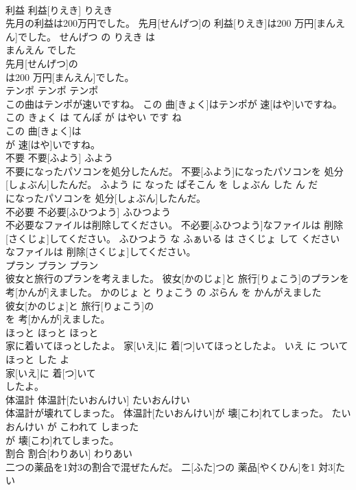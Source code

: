 \documentclass[8pt]{extreport}
\begin{document}
\begin{CJK}{UTF8}{min}
\\	利益	利益[りえき]	りえき	
\\	先月の利益は200万円でした。	先月[せんげつ]の 利益[りえき]は200 万円[まんえん]でした。	せんげつ の りえき は 
\\	まんえん でした	
\\	先月[せんげつ]の
\\	は200 万円[まんえん]でした。			
\\	テンポ	テンポ	テンポ	
\\	この曲はテンポが速いですね。	この 曲[きょく]はテンポが 速[はや]いですね。	この きょく は てんぽ が はやい です ね	
\\	この 曲[きょく]は
\\	が 速[はや]いですね。			
\\	不要	不要[ふよう]	ふよう	
\\	不要になったパソコンを処分したんだ。	不要[ふよう]になったパソコンを 処分[しょぶん]したんだ。	ふよう に なった ぱそこん を しょぶん した ん だ	
\\	になったパソコンを 処分[しょぶん]したんだ。			
\\	不必要	不必要[ふひつよう]	ふひつよう	
\\	不必要なファイルは削除してください。	不必要[ふひつよう]なファイルは 削除[さくじょ]してください。	ふひつよう な ふぁいる は さくじょ して ください	
\\	なファイルは 削除[さくじょ]してください。			
\\	プラン	プラン	プラン	
\\	彼女と旅行のプランを考えました。	彼女[かのじょ]と 旅行[りょこう]のプランを 考[かんが]えました。	かのじょ と りょこう の ぷらん を かんがえました	
\\	彼女[かのじょ]と 旅行[りょこう]の
\\	を 考[かんが]えました。			
\\	ほっと	ほっと	ほっと	
\\	家に着いてほっとしたよ。	家[いえ]に 着[つ]いてほっとしたよ。	いえ に ついて ほっと した よ	
\\	家[いえ]に 着[つ]いて
\\	したよ。			
\\	体温計	体温計[たいおんけい]	たいおんけい	
\\	体温計が壊れてしまった。	体温計[たいおんけい]が 壊[こわ]れてしまった。	たいおんけい が こわれて しまった	
\\	が 壊[こわ]れてしまった。			
\\	割合	割合[わりあい]	わりあい	
\\	二つの薬品を1対3の割合で混ぜたんだ。	二[ふた]つの 薬品[やくひん]を1 対3[たい 

\end{CJK}
\end{document}
